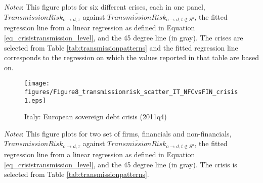 \documentclass[12pt,oneside,leqno]{article}
\begin{document}
\vspace{-.15in}
\begin{minipage}[!h]{.85\textwidth}
\footnotesize\textit{Notes}: This figure plots for six different crises, each in one panel, $\textit{TransmissionRisk}_{o\to d, \tau}$ against $\overline{\textit{TransmissionRisk}}_{o\to d, t\notin S^{o}}$, the fitted regression line from a linear regression as defined in Equation \ref{eq_crisistransmission_level}, and the 45 degree line (in gray). The crises are selected from Table \ref{tab:transmissionpatterns} and the fitted regression line corresponds to the regression on which the values reported in that table are based on.
\end{minipage}



\clearpage
\begin{figure}[!h]
\centering
\caption{Italy: European sovereign debt crisis (2011q4)}\label{fig:transmissionrisk_fin}
\texttt{[image: figures/Figure8\_transmissionrisk\_scatter\_IT\_NFCvsFIN\_crisis1.eps]}

\end{figure}
\vspace{-.1in}
\begin{minipage}[!h]{\textwidth}
\footnotesize\textit{Notes}: This figure plots for two set of firms, financials and non-financials, $\textit{TransmissionRisk}_{o\to d, \tau}$ against $\overline{\textit{TransmissionRisk}}_{o\to d, t\notin S^{o}}$, the fitted regression line from a linear regression as defined in Equation \ref{eq_crisistransmission_level}, and the 45 degree line (in gray). The crisis is selected from Table \ref{tab:transmissionpatterns}.
\end{minipage}
\end{document}
